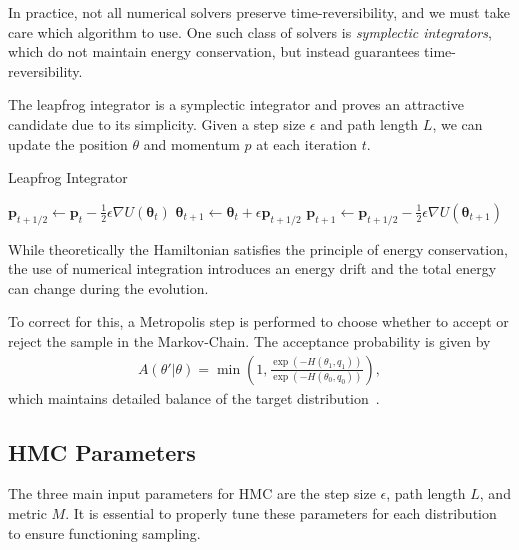 \documentclass[11pt]{article}
\begin{document}
    In practice, not all numerical solvers preserve time-reversibility, and we must take care which algorithm to use.
    One such class of solvers is \emph{symplectic integrators}, which do not
    maintain energy conservation, but instead guarantees time-reversibility.

    The leapfrog integrator is a symplectic integrator and proves an attractive candidate due to its simplicity.
    Given a step size $\epsilon$ and path length $L$, we can update the position $\theta$ and momentum $p$ at each iteration $t$.
    \begin{algorithm}
    \caption{Leapfrog Integrator}
    \label{alg:leapfrog_integrator}
    \begin{algorithmic}
        \STATE {}
        \STATE $\mathbf{p}_{t+1/2} \gets \mathbf{p}_t - \frac{1}{2} \epsilon \nabla U(\mathbf{\theta}_t)$
        \STATE
        \STATE $ \mathbf{\theta}_{t+1} \gets \mathbf{\theta}_t + \epsilon \mathbf{p}_{t+1/2}$
        \STATE
        \STATE $ \mathbf{p}_{t+1} \gets \mathbf{p}_{t+1/2} - \frac{1}{2} \epsilon \nabla U(\mathbf{\theta}_{t+1})$
        \ENDFOR
    \end{algorithmic}
    \end{algorithm}

    While theoretically the Hamiltonian satisfies the principle of energy conservation, the use of numerical
    integration introduces an energy drift and the total energy can change during the evolution.

    To correct for this, a Metropolis step is performed to choose whether to accept or reject the sample in
    the Markov-Chain.
    The acceptance probability is given by
    \begin{equation}\label{eq:hmc_accept_prob}
    \begin{aligned}
        A(\theta' | \theta) = \min \left(1, \frac{\exp(-H(\theta_1, q_1)) }{\exp(-H(\theta_0, q_0)) } \right),
    \end{aligned}
    \end{equation}
    which maintains detailed balance of the target distribution~\cite{betancourt2018conceptual}.

\subsection{HMC Parameters}\label{subsec:hmc_params}
    The three main input parameters for HMC are the step size $\epsilon$, path length $L$, and metric $M$.
    It is essential to properly tune these parameters for each distribution to ensure functioning sampling.
\end{document}
